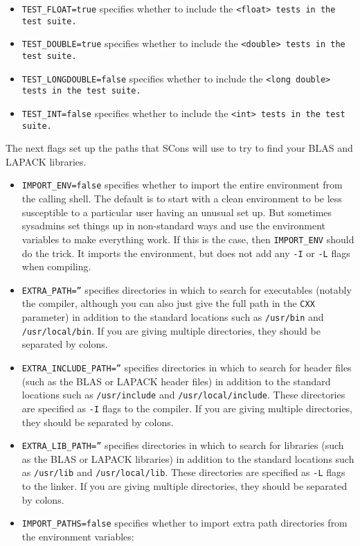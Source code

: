 \begin{enumerate}
\begin{itemize}
\item \texttt{TEST\_FLOAT=true} specifies whether to include the \tt{<float>} tests in the test suite.
\item \texttt{TEST\_DOUBLE=true} specifies whether to include the \tt{<double>} tests in the test suite.
\item \texttt{TEST\_LONGDOUBLE=false} specifies whether to include the \tt{<long double>} tests in the test suite.
\item \texttt{TEST\_INT=false} specifies whether to include the \tt{<int>} tests in the test suite.
\end{itemize}
The next flags set up the paths that SCons will use to try to find your BLAS and LAPACK libraries.
\begin{itemize}
\item \texttt{IMPORT\_ENV=false} specifies whether to import the entire environment from the calling shell.
The default
is to start with a clean environment to be less susceptible to a particular user having an unusual set up.  But sometimes sysadmins set things up in non-standard ways and use
the environment variables to make everything work.  If this is the case, then 
\texttt{IMPORT\_ENV} should do the trick.  It imports the environment, but does not add any
\texttt{-I} or \texttt{-L} flags when compiling.
\item \texttt{EXTRA\_PATH=''} specifies directories in which to search for executables (notably the compiler, although you can also just give the full path in the \texttt{CXX} parameter)
in addition to the standard locations such as \texttt{/usr/bin} and \texttt{/usr/local/bin}.
If you are giving multiple directories, they should be separated by colons.
\item \texttt{EXTRA\_INCLUDE\_PATH=''} specifies directories in which to search for header files
(such as the BLAS or LAPACK header files)
in addition to the standard locations such as \texttt{/usr/include} and \texttt{/usr/local/include}.
These directories are specified as \texttt{-I} flags to the compiler.
If you are giving multiple directories, they should be separated by colons.
\item \texttt{EXTRA\_LIB\_PATH=''} specifies directories in which to search for libraries
(such as the BLAS or LAPACK libraries)
in addition to the standard locations such as \texttt{/usr/lib} and \texttt{/usr/local/lib}.  
These directories are specified as \texttt{-L} flags to the linker.
If you are giving multiple directories, they should be separated by colons.
\item \texttt{IMPORT\_PATHS=false} specifies whether to import extra path directories from the environment variables: 

\end{itemize}
\end{enumerate}
